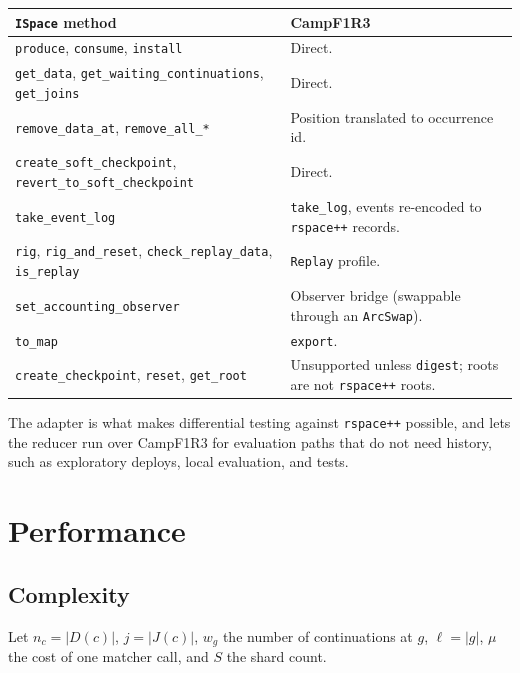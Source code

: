 \documentclass[11pt]{article}
\theoremstyle{plain}
\theoremstyle{definition}
\newcommand{\Camp}{CampF1R3}
\newcommand{\code}[1]{\texttt{#1}}
\begin{document}
\begin{center}
\begin{tabularx}{\linewidth}{@{}l>{\raggedright\arraybackslash}X@{}}
\toprule
\code{ISpace} method & \Camp{}\\
\midrule
\code{produce}, \code{consume}, \code{install} & Direct.\\
\code{get\_data}, \code{get\_waiting\_continuations}, \code{get\_joins} & Direct.\\
\code{remove\_data\_at}, \code{remove\_all\_*} & Position translated to occurrence id.\\
\code{create\_soft\_checkpoint}, \code{revert\_to\_soft\_checkpoint} & Direct.\\
\code{take\_event\_log} & \code{take\_log}, events re-encoded to \code{rspace++} records.\\
\code{rig}, \code{rig\_and\_reset}, \code{check\_replay\_data}, \code{is\_replay} & \code{Replay} profile.\\
\code{set\_accounting\_observer} & Observer bridge (swappable through an \code{ArcSwap}).\\
\code{to\_map} & \code{export}.\\
\code{create\_checkpoint}, \code{reset}, \code{get\_root} & Unsupported unless \code{digest}; roots are not \code{rspace++} roots.\\
\bottomrule
\end{tabularx}
\end{center}

The adapter is what makes differential testing against \code{rspace++} possible, and
lets the reducer run over \Camp{} for evaluation paths that do not need history, such as
exploratory deploys, local evaluation, and tests.

\section{Performance}\label{sec:perf}

\subsection{Complexity}

Let $n_c=|D(c)|$, $j=|J(c)|$, $w_g$ the number of continuations at $g$, $\ell=|g|$,
$\mu$ the cost of one matcher call, and $S$ the shard count.
\end{document}
